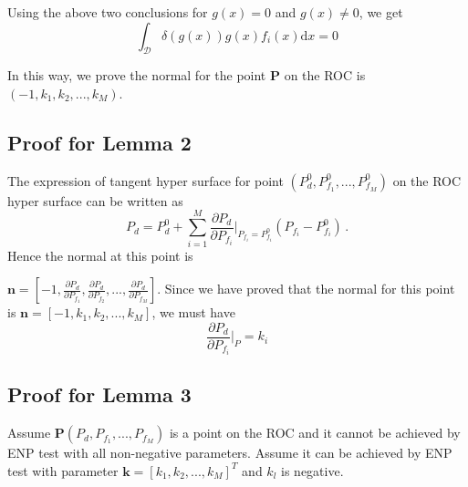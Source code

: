 \documentclass[12pt,journal,a4paper,twoside,onecolumn]{IEEEtran}
\begin{document}
\begin{spacing}{2.5}
Using the above two conclusions for $g(x) = 0$ and $g(x) \neq 0$, we get
\begin{equation}
\int_{\mathcal{D}} \delta (g(x)) g(x)f_i(x) \mathrm{d}x = 0
\end{equation}

In this way, we prove the normal for the point \textbf{P} on the ROC is $(-1, k_1, k_2, ..., k_M)$.

\subsection{Proof for Lemma 2}
The expression of tangent hyper surface for point $(P_d^0, P_{f_1}^0, ..., P_{f_M}^0)$ on the ROC hyper surface can be written as
\begin{equation}
P_d = P_d^0 + \sum_{i=1}^{M} \frac{\partial P_d}{\partial P_{f_i}}\bigg|_{P_{f_i} = P_{f_i}^0}(P_{f_i} - P_{f_i}^0)\,.
\end{equation}
Hence the normal at this point is

 $\mathbf{n} = [-1, \frac{\partial P_d}{\partial P_{f_1}}, \frac{\partial P_d}{\partial P_{f_2}}, ..., \frac{\partial P_d}{\partial P_{f_M}}]$. Since we have proved that  the normal for this point is $\mathbf{n} = [-1, k_1, k_2, ..., k_M]$, we must have
\begin{equation}
\frac{\partial P_d}{\partial P_{f_i}}\bigg|_{P} = k_i
\end{equation}


\subsection{Proof for Lemma 3}
Assume $\mathbf{P} (P_d, P_{f_1}, ..., P_{f_M})$ is a point on the ROC and it cannot be achieved by ENP test with all non-negative parameters. Assume it can be achieved by ENP test with parameter $\mathbf{k} = [k_1, k_2, ..., k_M]^T$ and $k_l$ is negative.


\end{spacing}
\end{document}
